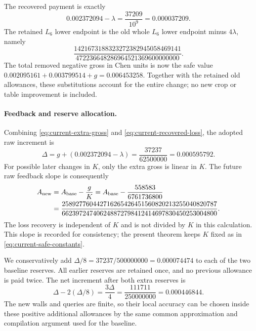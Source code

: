 The recovered payment is exactly
\begin{equation}
 0.002372094-\lambda=\frac{37209}{10^9}=0.000037209.
 \label{eq:current-recovered-loss}
\end{equation}
The retained $L_6$ lower endpoint is the old whole $L_6$ lower
endpoint minus $4\lambda$, namely
\[
 \frac{1421673188323272382945058469141}
      {472236648286964521369600000000}.
\]
The total removed negative gross in Chen units is now the safe
value $0.002095161+0.003799514+g=0.006453258$.
Together with the retained old allowances, these substitutions
account for the entire change; no new crop or table improvement
is included.

\paragraph{Feedback and reserve allocation.}
Combining \eqref{eq:current-extra-gross} and
\eqref{eq:current-recovered-loss}, the adopted raw increment is
\begin{equation}
 \Delta=g+(0.002372094-\lambda)
       =\frac{37237}{62500000}=0.000595792.
 \label{eq:current-refinement-delta}
\end{equation}
For possible later changes in $K$, only the extra gross is
linear in $K$.  The future raw feedback slope is consequently
\begin{align}
 A_{\rm new}
 &=A_{\rm base}-\frac{g}{K}
   =A_{\rm base}-\frac{558583}{6761736800}\notag\\
 &=\frac{258927760442716265426451560820213255040820787}
        {662397247406248872798412414697830450253004800}.
 \label{eq:current-refinement-slope}
\end{align}
The loss recovery is independent of $K$ and is not divided by
$K$ in this calculation.  This slope is recorded for consistency;
the present theorem keeps $K$ fixed as in
\eqref{eq:current-safe-constants}.

We conservatively add $\Delta/8=37237/500000000=0.000074474$
to each of the two baseline reserves.  All earlier reserves
are retained once, and no previous allowance is paid twice.
The net increment after both extra reserves is
\begin{equation}
 \Delta-2(\Delta/8)=\frac{3\Delta}{4}
                  =\frac{111711}{250000000}=0.000446844.
 \label{eq:current-refinement-net}
\end{equation}
The new walls and queries are finite, so their local accuracy
can be chosen inside these positive additional allowances by
the same common approximation and compilation argument used
for the baseline.

